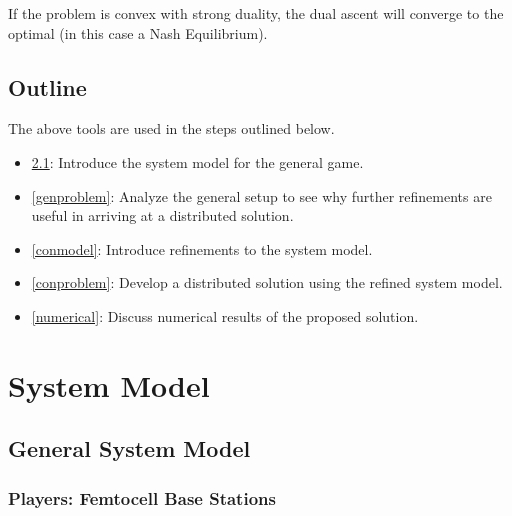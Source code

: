 \documentclass[12pt,a4paper]{report}
\begin{document}
\begin{enumerate}
If the problem is convex with strong duality, the dual ascent will converge to the optimal (in this case a Nash Equilibrium).

\end{enumerate}




\section{Outline}
The above tools are used in the steps outlined below. 
\begin{itemize}
\item 
\ref{genmodel}: Introduce the system model for the general game.
\item 
\ref{genproblem}: Analyze the general setup to see why further refinements are useful in arriving at a distributed solution. 
\item
\ref{conmodel}: Introduce refinements to the system model.
\item 
\ref{conproblem}: Develop a distributed solution using the refined system model.
\item 
\ref{numerical}: Discuss numerical results of the proposed solution. 
\end{itemize}
\chapter{System Model}

\section{General System Model}\label{genmodel}

\subsection{Players: Femtocell Base Stations}
\end{document}
